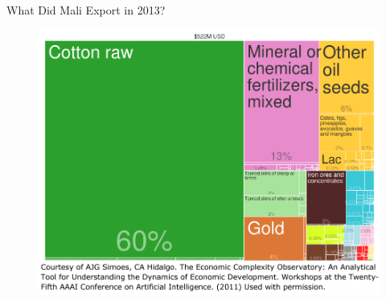 \documentclass[10pt,hyperref={CJKbookmarks=true},xcolor=dvipsnames,aspectratio=169]{beamer}
\begin{document}
\begin{frame}{What Did Mali Export in 2013?}


\begin{figure}
\includegraphics[scale=0.35]{fig/gravity/com2-5.PNG}
\end{figure}

\end{frame}
\end{document}
